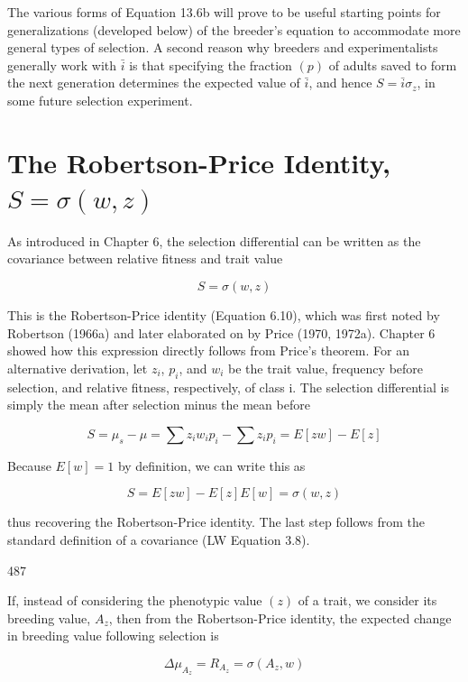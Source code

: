 \documentclass{article}
\begin{document}
The various forms of Equation 13.6b will prove to be useful starting points for generalizations (developed below) of the breeder's equation to accommodate more general types of selection. A second reason why breeders and experimentalists generally work with  $ \bar{i} $ is that specifying the fraction  $ (p) $ of adults saved to form the next generation determines the expected value of  $ \bar{i} $, and hence  $ S = \bar{i}\sigma_z $, in some future selection experiment.

\section{The Robertson-Price Identity,  $  S = \sigma(w, z)  $}
As introduced in Chapter 6, the selection differential can be written as the covariance between relative fitness and trait value

\begin{equation}
S=\sigma(w,z)
\tag{13.7a}
\label{eq:13_7a}
\end{equation}

This is the Robertson-Price identity (Equation 6.10), which was first noted by Robertson (1966a) and later elaborated on by Price (1970, 1972a). Chapter 6 showed how this expression directly follows from Price's theorem. For an alternative derivation, let  $ z_i $,  $ p_i $, and  $ w_i $ be the trait value, frequency before selection, and relative fitness, respectively, of class i. The selection differential is simply the mean after selection minus the mean before

\begin{equation}
S=\mu_{s}-\mu=\sum z_{i}w_{i}p_{i}-\sum z_{i}p_{i}=E[z w]-E[z]
\end{equation}

Because  $ E[w] = 1 $ by definition, we can write this as

\begin{equation}
S=E[z w]-E[z]E[w]=\sigma(w,z)
\end{equation}

thus recovering the Robertson-Price identity. The last step follows from the standard definition of a covariance (LW Equation 3.8).

487

If, instead of considering the phenotypic value  $ (z) $ of a trait, we consider its breeding value,  $ A_{z} $, then from the Robertson-Price identity, the expected change in breeding value following selection is

\begin{equation}
\Delta\mu_{A_{z}}=R_{A_{z}}=\sigma(A_{z},w)
\tag{13.7b}
\label{eq:13_7b}
\end{equation}
\end{document}
